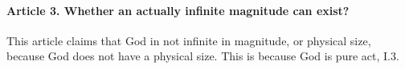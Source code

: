 \documentclass{ucetd}
\begin{document}
\paragraph{Article 3. Whether an actually infinite magnitude can exist?}
This article claims that God in not infinite in magnitude, or physical size, because God does not have a physical size. This is because God is pure act, I.3.
\end{document}

